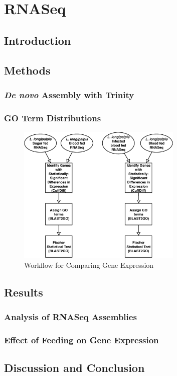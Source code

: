 \section{RNASeq}

\subsection{Introduction}

\subsection{Methods}

\subsubsection{\emph{De novo} Assembly with Trinity}

\subsubsection{GO Term Distributions}

\begin{figure}[H]
  \centering
  \includegraphics[width=0.7\textwidth]{figures/rnaseq/cuffdiff_workflow}
  \caption{Workflow for Comparing Gene Expression}
  \label{fig:rnaseq-cuffdiff-workflow}
\end{figure}

\subsection{Results}

\subsubsection{Analysis of RNASeq Assemblies}

\subsubsection{Effect of Feeding on Gene Expression}

\subsection{Discussion and Conclusion}
